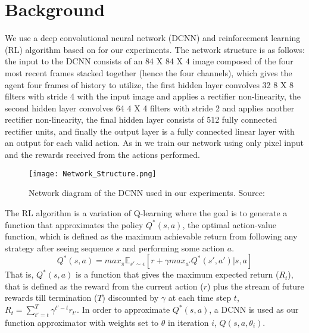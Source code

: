 \documentclass{llncs}
\begin{document}

%

%
\section{Background}

We use a deep convolutional neural network (DCNN) and reinforcement learning (RL) algorithm based on \citep{mnih2015human} for our experiments. The network structure is as follows: the input to the DCNN consists of an 84 X 84 X 4 image composed of the four most recent frames stacked together (hence the four channels), which gives the agent four frames of history to utilize, the first hidden layer convolves 32 8 X 8 filters with stride 4 with the input image and applies a rectifier non-linearity, the second hidden layer convolves 64 4 X 4 filters with stride 2 and applies another rectifier non-linearity, the final hidden layer consists of 512 fully connected rectifier units, and finally the output layer is a fully connected linear layer with an output for each valid action. As in \citep{mnih2015human} we train our network using only pixel input and the rewards received from the actions performed. 

\begin{figure}[H]
  \centering
  \texttt{[image: Network\_Structure.png]}
  \caption{Network diagram of the DCNN used in our experiments. Source: \citep{mnih2015human}}
\end{figure}

The RL algorithm is a variation of Q-learning where the goal is to generate a function that approximates the policy $Q^{*}(s,a)$, the optimal action-value function, which is defined as the maximum achievable return from following any strategy after seeing sequence $s$ and performing some action $a$.
\begin{equation}
Q^{*}(s,a)=max_{\pi}{\mathbb{E}}_{s' \sim \epsilon} [r + \gamma max_{a'} Q^{*}(s',a') | s,a]
\end{equation}
That is, $Q^{*}(s,a)$ is a function that gives the maximum expected return ($R_{t}$), that is defined as the reward from the current action ($r$) plus the stream of future rewards till termination ($T$) discounted by $\gamma$ at each time step $t$, $R_{t}=\sum_{t' = t}^{T}\gamma^{t'-t}r_{t'}$.
In order to approximate $Q^{*}(s,a)$, a DCNN is used as our function approximator with weights set to $\theta$ in iteration $i$, $Q(s,a,\theta_{i})$.
\end{document}
